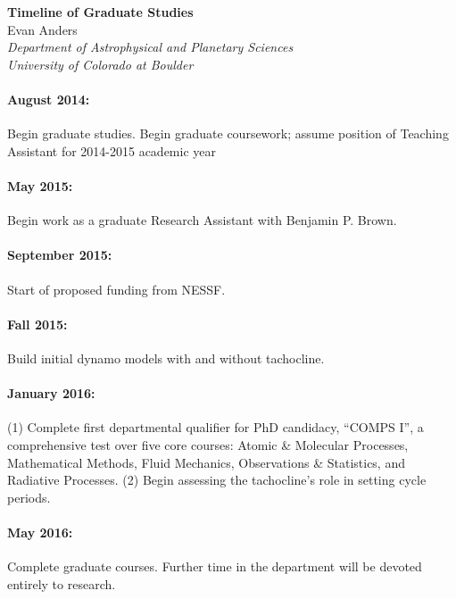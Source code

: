 \documentclass[aasms,12pt]{article}
\begin{document}
\begin{center}
   \large\textbf{Timeline of Graduate Studies}\\
   \vspace{0.4cm}
   \large{Evan Anders}\\
   \normalsize\textit{Department of Astrophysical and Planetary Sciences}\\
   \normalsize\textit{University of Colorado at Boulder}\\
\end{center}

\paragraph{August 2014:} Begin graduate studies.  Begin graduate coursework;
	assume position of Teaching Assistant for 2014-2015 academic year
\vspace{-0.4cm}
\paragraph{May 2015:} Begin work as a graduate Research Assistant with
	Benjamin P. Brown.

\vspace{-0.4cm}
\paragraph{September 2015:} Start of proposed funding from NESSF.

\vspace{-0.4cm}
\paragraph{Fall 2015:} Build initial dynamo models with and without tachocline.

\vspace{-0.4cm}
\paragraph{January 2016:} (1) Complete first departmental qualifier for PhD candidacy,
``COMPS I'', a comprehensive test over five core courses: Atomic \& Molecular Processes,
Mathematical Methods, Fluid Mechanics, Observations \& Statistics, and Radiative
Processes.  (2) Begin assessing the tachocline's role in setting cycle periods.

\vspace{-0.4cm}
\paragraph{May 2016:} Complete graduate courses.  Further time in the department
will be devoted entirely to research.
\end{document}

